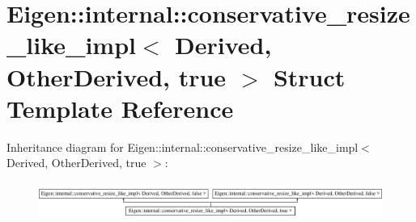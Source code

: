 \hypertarget{struct_eigen_1_1internal_1_1conservative__resize__like__impl_3_01_derived_00_01_other_derived_00_01true_01_4}{}\section{Eigen\+:\+:internal\+:\+:conservative\+\_\+resize\+\_\+like\+\_\+impl$<$ Derived, Other\+Derived, true $>$ Struct Template Reference}
\label{struct_eigen_1_1internal_1_1conservative__resize__like__impl_3_01_derived_00_01_other_derived_00_01true_01_4}
Inheritance diagram for Eigen\+:\+:internal\+:\+:conservative\+\_\+resize\+\_\+like\+\_\+impl$<$ Derived, Other\+Derived, true $>$\+:\begin{figure}[H]
\begin{center}
\leavevmode
\includegraphics[height=1.201717cm]{struct_eigen_1_1internal_1_1conservative__resize__like__impl_3_01_derived_00_01_other_derived_00_01true_01_4}
\end{center}
\end{figure}
